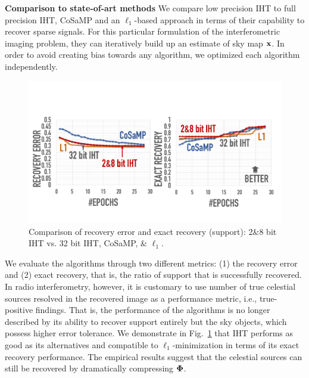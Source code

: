 \documentclass{article}
\begin{document}
{%

{\bf Comparison to state-of-art methods}
We compare low precision IHT to full precision IHT, CoSaMP and an $\ell_1$-based approach in terms of their capability to recover sparse signals. For this particular formulation of the interferometric imaging problem, they can iteratively build up an estimate of sky map ${\bf x}$. In order to avoid creating bias towards any algorithm, we optimized each algorithm independently.

\begin{figure}[t]
\centering
\includegraphics[width=1.05\columnwidth, angle=0]{figs/comparison.pdf}
\caption{Comparison of recovery error and exact recovery (support): {2\&8 bit} IHT vs. 32 bit IHT, CoSaMP, \& $\ell_1$.}
\label{fig:comparison}
\vspace{-1em}
\end{figure}

We evaluate the algorithms through two different metrics: (1) the recovery error and (2) exact recovery, that is, the ratio of support that is successfully recovered. In radio interferometry, however, it is customary to use number of true celestial sources resolved in the recovered image as a performance metric, i.e., true-positive findings. That is, the performance of the algorithms is no longer described by its ability to recover support entirely but the sky objects, which possess higher error tolerance. 
We demonstrate in Fig.~\ref{fig:comparison} that IHT performs as good as its alternatives and compatible to $\ell_1$-minimization in terms of its exact recovery performance. The empirical results suggest that the celestial sources can still be recovered by dramatically compressing ${\bf \Phi}$.

}
\end{document}
